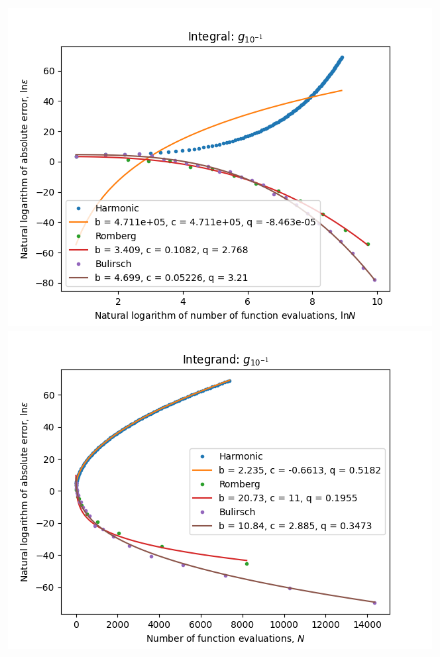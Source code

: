 \begin{figure}[H]
\centering
\begin{minipage}{0.45\textwidth}
\centering
\includegraphics[scale=0.45]{romberg_plots/g_tenth_hp_log_log_pow_fit_trend.png}
\end{minipage}
\begin{minipage}{0.45\textwidth}
\centering
\includegraphics[scale=0.45]{romberg_plots/g_tenth_hp_trend.png}
\end{minipage}
\end{figure}

